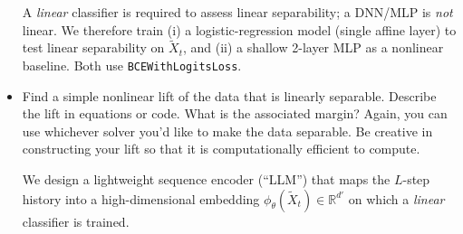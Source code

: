 \documentclass[a4paper]{article}
\begin{document}
\begin{itemize}
A \emph{linear} classifier is required to assess linear separability; a DNN/MLP is \emph{not} linear. 
We therefore train (i) a logistic-regression model (single affine layer) to test linear separability on $\tilde{X}_t$, and (ii) a shallow 2-layer MLP as a nonlinear baseline. 
Both use \texttt{BCEWithLogitsLoss}.

    \item Find a simple nonlinear lift of the data that is linearly separable.
        Describe the lift in equations or code.
        What is the associated margin? Again, you can use whichever solver you’d like to make the data separable.
        Be creative in constructing your lift so that it is computationally efficient to compute.


We design a lightweight sequence encoder (``LLM'') that maps the $L$-step history into a high-dimensional embedding $\phi_\theta(\tilde{X}_t)\in\mathbb{R}^{d'}$ on which a \emph{linear} classifier is trained.
\end{itemize}
\end{document}
